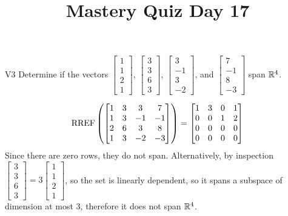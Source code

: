 \documentclass{sbgLAquiz}
\title{Mastery Quiz Day 17 }
\begin{document}
\begin{problem}{V3}
Determine if the vectors $\begin{bmatrix} 1 \\ 1 \\ 2 \\1 \end{bmatrix}$, $\begin{bmatrix} 3 \\ 3 \\ 6 \\ 3 \end{bmatrix}$, $\begin{bmatrix}3 \\ -1 \\ 3 \\ -2\end{bmatrix}$, and $\begin{bmatrix} 7 \\ -1 \\ 8 \\ -3 \end{bmatrix}$  span $\mathbb{R}^4$.
\end{problem}
\begin{solution}
$$\operatorname{RREF}\left(\begin{bmatrix} 1 & 3 & 3 & 7 \\ 1 & 3 & -1 & -1 \\ 2 & 6 & 3 & 8 \\ 1 & 3 & -2 & -3 \end{bmatrix}\right) = \begin{bmatrix} 1 & 3 & 0 & 1 \\ 0 & 0 & 1 & 2 \\ 0 & 0 & 0 & 0 \\ 0 & 0 & 0 & 0  \end{bmatrix}$$
Since there are zero rows, they do not span.  Alternatively, by inspection $\begin{bmatrix} 3 \\ 3 \\ 6 \\ 3 \end{bmatrix}=3\begin{bmatrix} 1 \\ 1 \\ 2 \\1 \end{bmatrix}$, so the set is linearly dependent, so it spans a subspace of dimension at most 3, therefore it does not span $\mathbb{R}^4$.
\end{solution}
\end{document}
